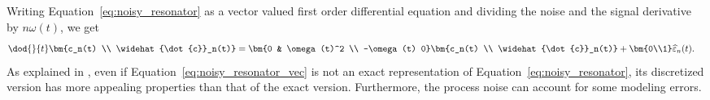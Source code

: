 Writing Equation~\eqref{eq:noisy_resonator} as a vector valued first order differential equation
and dividing the noise and the signal derivative by $n\omega(t)$, we get
\begin{align}
	\dod{}{t}\bm{c_n(t) \\ \widehat{\dot{c}}_n(t)} &= \bm{0 & \omega(t)^2 \\ -\omega(t) 0}\bm{c_n(t) \\
	\widehat{\dot{c}}_n(t)}+\bm{0\\1}
	\widehat{\varepsilon}_n(t).
	\label{eq:noisy_resonator_vec}
\end{align}
As explained in \textcite{Sarkka2012}, even if Equation~\eqref{eq:noisy_resonator_vec} is not an exact
representation of Equation~\eqref{eq:noisy_resonator}, its discretized version has more appealing
properties than that of the exact version. Furthermore, the process noise can account for some
modeling errors. 

